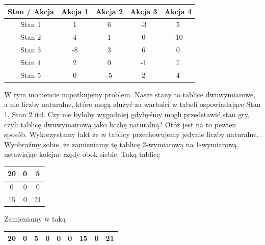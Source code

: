 \documentclass[a4paper,12pt]{article}
\begin{document}
\begin{center}
\begin{tabular}{ |c|c|c|c|c| }
\hline
Stan /  Akcja & Akcja 1 & Akcja 2 & Akcja 3 & Akcja 4 \\
\hline
Stan 1 & \small{1} & \small{6} & \small{-3} & \small{5} \\
\hline
Stan 2 & \small{4} & \small{1} & \small{0} & \small{-10} \\
\hline
Stan 3 & \small{-8} & \small{3} & \small{6} & \small{0} \\
\hline
Stan 4 & \small{2} & \small{0} & \small{-1} & \small{7} \\
\hline
Stan 5 & \small{0} & \small{-5} & \small{2} & \small{4} \\
\hline 
\end{tabular}
\newline \newline
\end{center} 
 W tym momencie napotkujemy problem. Nasze stany to tablice dwuwymiarowe, a nie liczby naturalne, które mogą służyć za wartości w tabeli ospowiadające Stan 1, Stan 2 itd. Czy nie byłoby wygodniej gdybyśmy mogli przedstawić stan gry, czyli tablicę dwuwymairową jako liczbę naturalną? Otóż jest na to pewien sposób. Wykorzystamy fakt że w tablicy przechowujemy jedynie liczby naturalne. Wyobraźmy sobie, że zamieniamy tę tablicę 2-wymiarową na 1-wymiarową, ustawiając kolejne rzędy obok siebie:
\newline \newline Taką tablicę
\begin{center}
\begin{tabular}{ |c|c|c| }
\hline
20 & 0 & 5 \\
\hline
0 & 0 & 0 \\
\hline
15 & 0 & 21 \\
\hline
\end{tabular}
\end{center} 
Zamieniamy w taką
\begin{center}
\begin{tabular}{ |c|c|c|c|c|c|c|c|c| }
\hline
20 & 0 & 5 & 0 & 0 & 0 & 15 & 0 & 21 \\
\hline
\end{tabular}
\newline
\end{center} 
\end{document}
